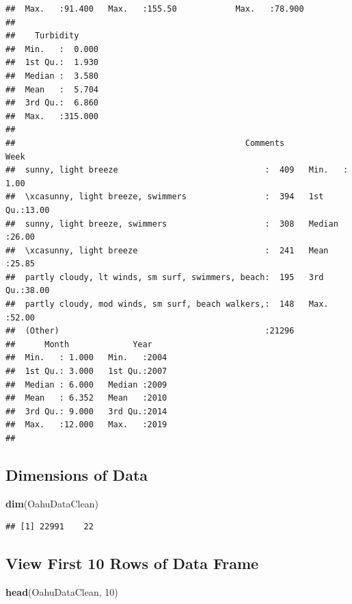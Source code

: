 \documentclass[12pt,]{article}
\newenvironment{Shaded}{\begin{snugshade}}{\end{snugshade}}
\newcommand{\KeywordTok}[1]{\textcolor[rgb]{0.13,0.29,0.53}{\textbf{#1}}}
\newcommand{\DecValTok}[1]{\textcolor[rgb]{0.00,0.00,0.81}{#1}}
\newcommand{\NormalTok}[1]{#1}
\begin{document}
\begin{verbatim}
##  Max.   :91.400   Max.   :155.50            Max.   :78.900  
##                                                             
##    Turbidity      
##  Min.   :  0.000  
##  1st Qu.:  1.930  
##  Median :  3.580  
##  Mean   :  5.704  
##  3rd Qu.:  6.860  
##  Max.   :315.000  
##                   
##                                               Comments          Week      
##  sunny, light breeze                              :  409   Min.   : 1.00  
##  \xcasunny, light breeze, swimmers                :  394   1st Qu.:13.00  
##  sunny, light breeze, swimmers                    :  308   Median :26.00  
##  \xcasunny, light breeze                          :  241   Mean   :25.85  
##  partly cloudy, lt winds, sm surf, swimmers, beach:  195   3rd Qu.:38.00  
##  partly cloudy, mod winds, sm surf, beach walkers,:  148   Max.   :52.00  
##  (Other)                                          :21296                  
##      Month             Year     
##  Min.   : 1.000   Min.   :2004  
##  1st Qu.: 3.000   1st Qu.:2007  
##  Median : 6.000   Median :2009  
##  Mean   : 6.352   Mean   :2010  
##  3rd Qu.: 9.000   3rd Qu.:2014  
##  Max.   :12.000   Max.   :2019  
## 
\end{verbatim}

\subsection{Dimensions of Data}\label{dimensions-of-data}

\begin{Shaded}
\begin{Highlighting}[]
\KeywordTok{dim}\NormalTok{(OahuDataClean)}
\end{Highlighting}
\end{Shaded}

\begin{verbatim}
## [1] 22991    22
\end{verbatim}

\subsection{View First 10 Rows of Data
Frame}\label{view-first-10-rows-of-data-frame}

\begin{Shaded}
\begin{Highlighting}[]
\KeywordTok{head}\NormalTok{(OahuDataClean, }\DecValTok{10}\NormalTok{)}
\end{Highlighting}
\end{Shaded}
\end{document}
